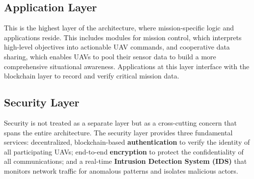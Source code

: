 \subsection{Application Layer}
This is the highest layer of the architecture, where mission-specific logic and applications reside. This includes modules for mission control, which interprets high-level objectives into actionable UAV commands, and cooperative data sharing, which enables UAVs to pool their sensor data to build a more comprehensive situational awareness. Applications at this layer interface with the blockchain layer to record and verify critical mission data.

\subsection{Security Layer}
Security is not treated as a separate layer but as a cross-cutting concern that spans the entire architecture. The security layer provides three fundamental services: decentralized, blockchain-based \textbf{authentication} to verify the identity of all participating UAVs; end-to-end \textbf{encryption} to protect the confidentiality of all communications; and a real-time \textbf{Intrusion Detection System (IDS)} that monitors network traffic for anomalous patterns and isolates malicious actors. 

